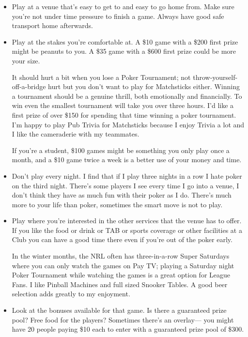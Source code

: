 \begin{itemize}

\item Play at a venue that's easy to get to and easy to go home
from. Make sure you're not under time pressure to finish a game.
Always have good safe transport home afterwards.

\item Play at the stakes you're comfortable at. A \$10
game with a \$200 first prize might be peanuts to you.
A \$35 game with a \$600 first prize could be more your size.

It should hurt a bit when you lose a Poker Tournament; not
throw-yourself-off-a-bridge hurt but you don't want to play for
Matchsticks either. Winning a tournament should be a genuine thrill,
both emotionally and financially. To win even the smallest tournament
will take you over three hours. I'd like a first prize of over \$150 for
spending that time winning a poker tournament. I'm happy to play Pub
Trivia for Matchsticks because I enjoy Trivia a lot and I like
the cameraderie with my teammates.

If you're a student, \$100 games might be something
you only play once a month, and a \$10 game twice a week is
a better use of your money and time.

\item Don't play every night. I find that if I play
three nights in a row I hate poker on the third
night. There's some players I see every time I go into a venue,
I don't think they have as much fun with their poker as I do.
There's much more to your life than poker, sometimes the smart
move is not to play.

\item Play where you're interested in the other services
that the venue has to offer. If you like the food or drink or
TAB or sports coverage or other facilities at a Club you can
have a good time there even if you're out of the poker early.

In the winter months, the NRL often has three-in-a-row Super Saturdays
where you can only watch the games on Pay TV; playing a Saturday night
Poker Tournament while watching the games is a great option
for League Fans. I like Pinball Machines and full
sized Snooker Tables. A good beer selection adds greatly to my
enjoyment.

\item Look at the bonuses available for that game. Is there a
guaranteed prize pool? Free food for the players? Sometimes
there's an overlay--- you might have 20 people paying \$10 each
to enter with a guaranteed prize pool of \$300.


\end{itemize}
